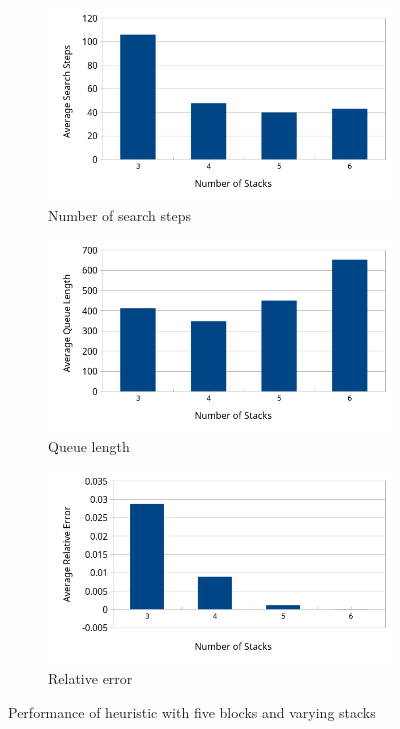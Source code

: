 \documentclass{article}
\begin{document}
\begin{figure}
    \centering
    \begin{subfigure}{\linewidth}
	\centering
	\includegraphics[width=.65\linewidth]{H2_AvgStepsVsStacks.png}\hfill
	\caption{Number of search steps}
    \end{subfigure}\par\medskip
    \begin{subfigure}{\linewidth}
	\centering
	\includegraphics[width=.65\linewidth]{H2_AvgQLVsStacks.png}\hfill
	\caption{Queue length}
    \end{subfigure}\par\medskip
    \begin{subfigure}{\linewidth}
	\centering
	\includegraphics[width=.65\linewidth]{H2_AvgRelErrVsStacks.png}\hfill
	\caption{Relative error}
    \end{subfigure}
    \caption{Performance of heuristic with five blocks and varying stacks}
    \label{fig:heuristic}
\end{figure}
\end{document}
